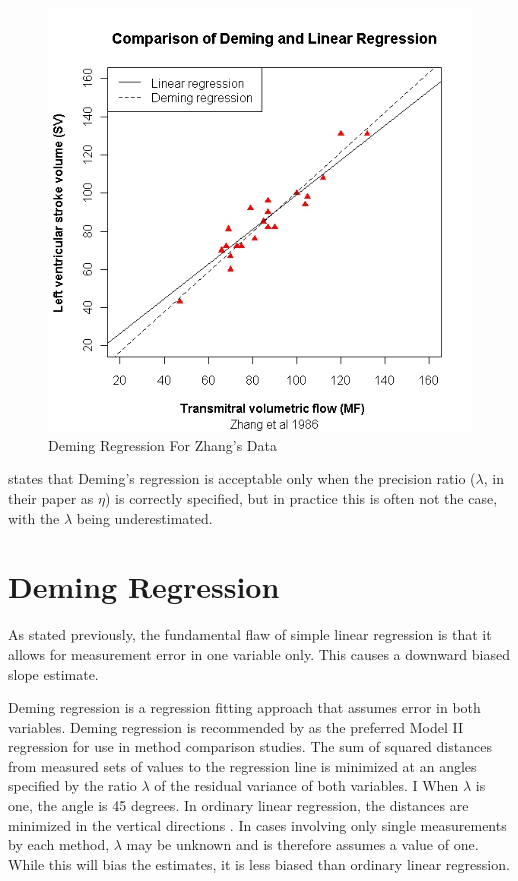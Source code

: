 \documentclass[12pt, a4paper]{report}
\theoremstyle{plain}
\theoremstyle{definition}
\theoremstyle{remark}
\begin{document}
	
	\begin{figure}[h!]
		\includegraphics[width=130mm]{images/ZhangDeming.jpeg}
		\caption{Deming Regression For Zhang's Data}\label{ZhangDeming}
	\end{figure}
	
	
	\citet{CarollRupert} states that Deming's
	regression is acceptable only when the precision ratio ($\lambda$,
	in their paper as $\eta$) is correctly specified, but in practice
	this is often not the case, with the $\lambda$ being
	underestimated.
	\newpage
		\section{Deming Regression}
		
		As stated previously, the fundamental flaw of simple linear regression is that it allows for measurement error in one variable only. This causes a downward biased slope estimate.
		
		Deming regression is a regression fitting approach that assumes error in both variables. Deming regression is recommended by \citet*{CornCoch} as the
		preferred Model II regression for use in method comparison
		studies.
		The sum of squared distances from measured sets of values to the regression line is minimized at an angles specified by the ratio $\lambda$ of the residual variance of both variables. I
		When $\lambda$ is one, the angle is 45 degrees. In ordinary linear regression, the distances are minimized in the vertical directions \citep{linnet99}.
		In cases involving only single measurements by each method, $\lambda$ may be unknown and is therefore assumes a value of one. While this will bias the estimates, it is less biased than ordinary linear regression.
		
\end{document}
